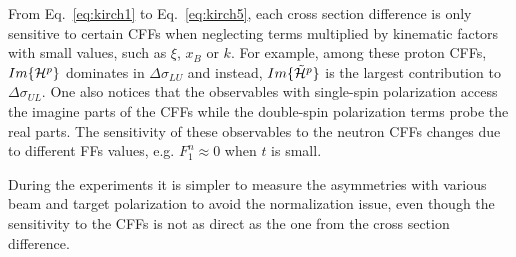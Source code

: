 From Eq.~\ref{eq:kirch1} to Eq.~\ref{eq:kirch5}, each cross section difference is only sensitive to certain CFFs when neglecting terms multiplied by kinematic factors with small values, such as $\xi$, $x_{B}$ or $k$. For example, among these proton CFFs,  $Im\{{\cal H}^{p}\}$ dominates in $\Delta\sigma_{LU}$ and instead, $Im\{\tilde {\cal H}^{p}\}$ is the largest contribution to $\Delta\sigma_{UL}$. One also notices that the observables with single-spin polarization access the imagine parts of the CFFs while the double-spin polarization terms probe the real parts. The sensitivity of these observables to the neutron CFFs changes due to different FFs values, e.g. $F^{n}_{1}\approx 0$ when $t$ is small.

During the experiments it is simpler to measure the asymmetries with various beam and target polarization to avoid the normalization issue, even though the sensitivity to the CFFs is not as direct as the one from the cross section difference. %
% 
% 
% 
% 

